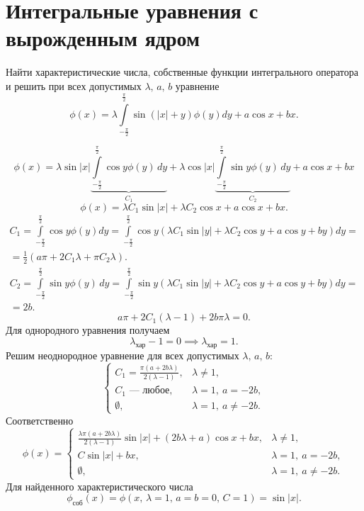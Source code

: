 \documentclass[a4paper]{article}
\begin{document}
\section{Интегральные уравнения с вырожденным ядром}
\begin{hiProb}[№1]
Найти характеристические числа, собственные функции
интегрального оператора и решить при всех допустимых
$\lambda,\,a,\,b$ уравнение
\[
	\phi(x) =\lambda \int\limits_{-\frac{\pi}{2}}^{\frac{\pi}{2}} \sin \left( |x|+y \right) \phi(y)dy+a \cos x +b x 
.\] 
\end{hiProb}
\begin{sol}
	\[\phi (x)=\lambda \sin |x| \underbrace{\int\limits_{-\frac{\pi}{2}}^{\frac{\pi}{2}}\cos y \phi(y)\,dy}_{C_1}+
	\lambda \cos |x| \underbrace{\int\limits_{-\frac{\pi}{2}}^{\frac{\pi}{2}} \sin y \phi(y) \, dy}_{C_2}+ a \cos x+bx \]
\[
	\phi(x)= \lambda C_1 \sin|x|+ \lambda C_2 \cos x+
	a \cos x +bx
.\] 
\begin{multline*}
	C_1= \int\limits_{-\frac{\pi}{2}}^{\frac{\pi}{2}} \cos y \phi(y) dy= \int\limits_{-\frac{\pi}{2}}^{\frac{\pi}{2}} \cos y
	\left( \lambda C_1 \sin|y|+ \lambda C_2 \cos y+
	a \cos y +by\right) dy=\\=
	\frac{1}{2}(a\pi +2C_1 \lambda+\pi C_2 \lambda)
.\end{multline*} 
\begin{multline*}
C_2= \int\limits_{-\frac{\pi}{2}}^{\frac{\pi}{2}}  \sin
y \phi(y)\, dy= \int\limits_{-\frac{\pi}{2}}^{\frac{\pi}{2}} 
\sin y \left( \lambda C_1 \sin |y| +\lambda C_2 \cos y+
a \cos y+by\right) dy=\\=2b
.\end{multline*} 
\[
	a\pi+ 2C_1 (\lambda-1)+2b \pi \lambda=0
.\] 
Для однородного уравнения получаем
\[
\lambda_\text{хар}-1=0 \implies \lambda_\text{хар}=1
.\] 
Решим неоднородное уравнение для всех допустимых $\lambda,\,a,\,b$:
\[
\begin{cases}
	C_1= \frac{\pi(a+2b \lambda)}{2(\lambda-1)},& \lambda \neq 1,\\
	C_1 \text{ --- любое},& \lambda=1,\ a=-2b,\\
	\emptyset,& \lambda=1,\ a\neq-2b.
\end{cases}
\] 
Соответственно
\[
	\phi(x) =
\begin{cases}
	\frac{\lambda \pi (a+2b\lambda)}{2(\lambda-1)}\sin|x|+
	(2b\lambda+a) \cos x+bx,& \lambda \neq 1,\\
	C \sin|x|+bx,& \lambda=1,\ a=-2b,\\
	\emptyset,& \lambda=1,\ a\neq -2b.
\end{cases}
\] 
Для найденного характеристического числа
\[
	\phi_\text{соб}(x)=\phi(x,\,\lambda=1,\,a=b=0,\,C=1)=
\sin|x|
.\] 
\end{sol}
\end{document}
